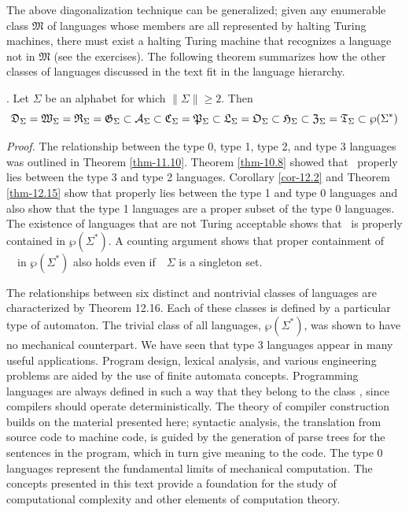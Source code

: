 The above diagonalization technique can be generalized; given any enumerable
class $\mathfrak{M}$ of languages whose members are all represented by halting
Turing machines, there must exist a halting Turing machine that recognizes a
language not in $\mathfrak{M}$ (see the exercises). The following theorem
summarizes how the other classes of languages discussed in the text fit in the
language hierarchy.

\begin{thm}\label{thm-12.16}.
Let $\Sigma$ be an alphabet for which $\|\Sigma\|\geq 2$. Then
\[ \mathfrak{D}_\Sigma=\mathfrak{W}_\Sigma=\mathfrak{R}_\Sigma=\mathfrak{G}_\Sigma\subset\mathcal{A}_\Sigma\subset\mathfrak{C}_\Sigma=\mathfrak{P}_\Sigma\subset\mathfrak{L}_\Sigma=\mathfrak{O}_\Sigma
	\subset\mathfrak{H}_\Sigma\subset\mathfrak{Z}_\Sigma=\mathfrak{T}_\Sigma\subset\wp(\Sigma^*) \]

\emph{Proof.} The relationship between the type 0, type 1, type 2, and type 3
languages was outlined in Theorem \ref{thm-11.10}. Theorem \ref{thm-10.8} showed
that \ASIG\ properly lies between the type 3 and type 2 languages. Corollary
\ref{cor-12.2} and Theorem \ref{thm-12.15} show that \HSIG properly lies between
the type 1 and type 0 languages and also show that the type 1 languages are a
proper subset of the type 0 languages. The existence of languages that are not
Turing acceptable shows that \TSIG\ is properly contained in $\wp(\Sigma^*)$. A
counting argument shows that proper containment of \ \TSIG\ in $\wp(\Sigma^*)$
also holds even if\ \ $\Sigma$ is a singleton set.
\end{thm}

The relationships between six distinct and nontrivial classes of languages are
characterized by Theorem 12.16. Each of these classes is defined by a particular
type of automaton. The trivial class of all languages, $\wp(\Sigma^*)$, was
shown to have no mechanical counterpart. We have seen that type 3 languages
appear in many useful applications. Program design, lexical analysis, and
various engineering problems are aided by the use of finite automata concepts.
Programming languages are always defined in such a way that they belong to the
class \ASIG, since compilers should operate deterministically. The theory of
compiler construction builds on the material presented here; syntactic analysis,
the translation from source code to machine code, is guided by the generation of
parse trees for the sentences in the program, which in turn give meaning to the
code. The type 0 languages represent the fundamental limits of mechanical
computation. The concepts presented in this text provide a foundation for the
study of computational complexity and other elements of computation theory.

